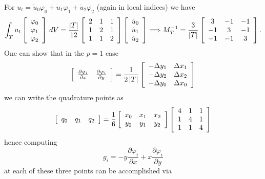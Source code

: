 \documentclass[letterpaper,10pt]{article}
\begin{document}
For \(u_t = \dot{u}_0 \varphi_0 + \dot{u}_1 \varphi_1 + \dot{u}_2 \varphi_2\)
(again in local indices) we have
\[\int_T u_t \left[ \begin{array}{c}
\varphi_0 \\ \varphi_1 \\ \varphi_2 \end{array}\right] \, dV =
\frac{\left|T\right|}{12} \left[ \begin{array}{c c c}
2 & 1 & 1 \\
1 & 2 & 1 \\
1 & 1 & 2 \end{array}\right] \left[ \begin{array}{c}
\dot{u}_0 \\ \dot{u}_1 \\ \dot{u}_2 \end{array}\right] \Longrightarrow
M_T^{-1} = \frac{3}{\left|T\right|} \left[ \begin{array}{c c c}
 3 & -1 & -1 \\
-1 &  3 & -1 \\
-1 & -1 &  3 \end{array}\right].\]
One can show that in the \(p = 1\) case
\[\left[ \begin{array}{c c}
\frac{\partial \varphi_i}{\partial x} &
\frac{\partial \varphi_i}{\partial y}
\end{array}\right] =
\frac{1}{2\left|T\right|} \left[ \begin{array}{c c}
-\Delta y_1 & \Delta x_1 \\
-\Delta y_2 & \Delta x_2 \\
-\Delta y_0 & \Delta x_0
\end{array}\right]\]
we can write the quadrature points as
\[\left[ \begin{array}{c c c}
q_0 & q_1 & q_2
\end{array}\right]
= \frac{1}{6} \left[ \begin{array}{c c c}
x_0 & x_1 & x_2 \\
y_0 & y_1 & y_2
\end{array}\right] \left[ \begin{array}{c c c}
4 & 1 & 1 \\
1 & 4 & 1 \\
1 & 1 & 4
\end{array}\right]\]
hence computing
\[g_i = -y \frac{\partial \varphi_i}{\partial x} +
x \frac{\partial \varphi_i}{\partial y}\]
at each of these three points can be accomplished via
\end{document}
